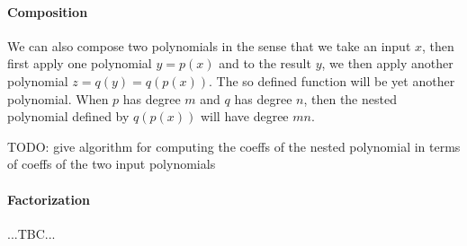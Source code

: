 
\paragraph{Composition}
We can also compose two polynomials in the sense that we take an input $x$, then first apply one polynomial $y = p(x)$ and to the result $y$, we then apply another polynomial $z = q(y) = q(p(x))$. The so defined function will be yet another polynomial. When $p$ has degree $m$ and $q$ has degree $n$, then the nested polynomial defined by $q(p(x))$ will have degree $m n$.

TODO: give algorithm for computing the coeffs of the nested polynomial in terms of coeffs of the two input polynomials








\paragraph{Factorization} ...TBC...

